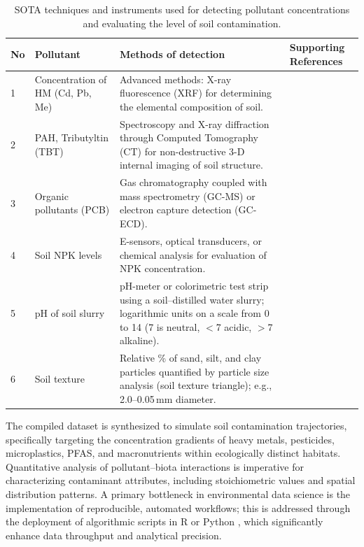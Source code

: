 \documentclass[sn-mathphys-num]{sn-jnl}
\begin{document}
\begin{table}[htbp]
\caption{SOTA techniques and instruments used for detecting pollutant
    concentrations and evaluating the level of soil
    contamination.}\label{tab1}
\begin{tabularx}{\textwidth}{@{} p{1.0cm} p{2.0cm} p{5.0cm} X @{}}
\toprule
\textbf{No} & \textbf{Pollutant} & \textbf{Methods of detection}
    & \textbf{Supporting References} \\
\midrule
1 & Concentration of HM (Cd, Pb, Me)
    & Advanced methods: X-ray fluorescence (XRF) for determining the
      elemental composition of soil.
    & \cite{Lu2023,LindhLemenkova2023b,Wan2019,Mukhopadhyay2020,Adewumi2024,Feng2024,Hu2020,Li2019} \\[4pt]
2 & PAH, Tributyltin (TBT)
    & Spectroscopy and X-ray diffraction through Computed Tomography (CT)
      for non-destructive 3-D internal imaging of soil structure.
    & \cite{LindhLemenkova2022d,Deceuster2012,Racic2025,LindhLemenkova2022a,Xu2026,Stojic2019} \\[4pt]
3 & Organic pollutants (PCB)
    & Gas chromatography coupled with mass spectrometry (GC-MS) or electron
      capture detection (GC-ECD).
    & \cite{Bustamante2025,Anagnostou2025,Sandu2025,Shen2024,Appel2022,Arnesdotter2025} \\[4pt]
4 & Soil NPK levels
    & E-sensors, optical transducers, or chemical analysis for evaluation of
      NPK concentration.
    & \cite{Hossain2024,Pal2024,Ma2024,Guan2024,Atoloye2024,Luo2017} \\[4pt]
5 & pH of soil slurry
    & pH-meter or colorimetric test strip using a soil--distilled water
      slurry; logarithmic units on a scale from 0 to 14 (7 is neutral,
      $<$7 acidic, $>$7 alkaline).
    & \cite{Zireeni2023,LindhLemenkova2022b,Rahman2014,Hepperly2009,LindhLemenkova2023c,Guo2021} \\[4pt]
6 & Soil texture
    & Relative \% of sand, silt, and clay particles quantified by particle
      size analysis (soil texture triangle); e.g., 2.0--0.05\,mm diameter.
    & \cite{Polakowski2023,LindhLemenkova2023d,Mozaffari2026,LindhLemenkova2023a,LindhLemenkova2023e,Jing2023,Wang2022} \\
\bottomrule
\end{tabularx}
\end{table}

The compiled dataset is synthesized to simulate soil contamination
trajectories, specifically targeting the concentration gradients of heavy
metals, pesticides, microplastics, PFAS, and macronutrients within
ecologically distinct habitats. Quantitative analysis of pollutant--biota
interactions is imperative for characterizing contaminant attributes,
including stoichiometric values and spatial distribution patterns. A primary
bottleneck in environmental data science is the implementation of
reproducible, automated workflows; this is addressed through the deployment
of algorithmic scripts in R or Python
\cite{Olah2025,Lemenkova2022,Wang2024b}, which significantly enhance data
throughput and analytical precision.
\end{document}
